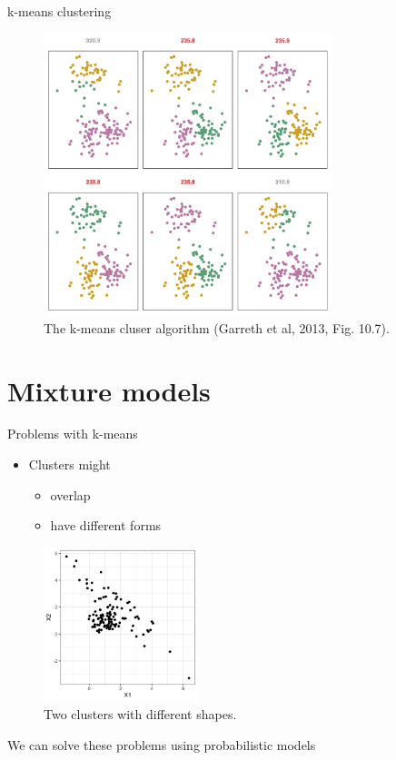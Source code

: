 \documentclass[10pt]{beamer}
\begin{document}
\begin{frame}{k-means clustering}

\begin{figure}[h]
\centering
\includegraphics[width=0.75\textwidth]{fig/fig_10_7_kmeans_local_modes.png}
\caption{The k-means cluser algorithm (Garreth et al, 2013, Fig. 10.7).}
\end{figure}

\end{frame}


\section{Mixture models}

\begin{frame}{Problems with k-means}

\begin{itemize}
\item Clusters might
\begin{itemize}
\item overlap
\item have different forms
\end{itemize}
\end{itemize}

\begin{figure}[h]
\centering
\includegraphics[width=0.4\textwidth]{fig/mix_models.png}
\caption{Two clusters with different shapes.}
\end{figure}

\pause
We can solve these problems using {\color{uured} probabilistic models}

\end{frame}
\end{document}
